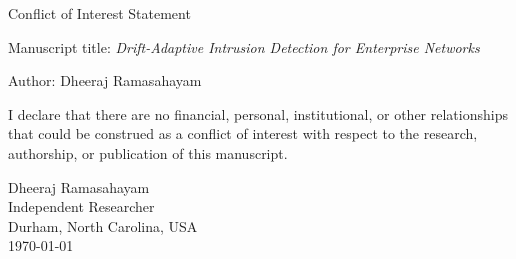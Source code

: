 \documentclass[11pt]{article}
\begin{document}
\begin{center}
{\Large Conflict of Interest Statement}
\end{center}

\vspace{1em}

Manuscript title: \textit{Drift-Adaptive Intrusion Detection for Enterprise Networks}

\vspace{1em}

Author: Dheeraj Ramasahayam

\vspace{1em}

I declare that there are no financial, personal, institutional, or other relationships that could be construed as a conflict of interest with respect to the research, authorship, or publication of this manuscript.

\vspace{2em}

\noindent Dheeraj Ramasahayam\\
Independent Researcher\\
Durham, North Carolina, USA\\
\today
\end{document}
